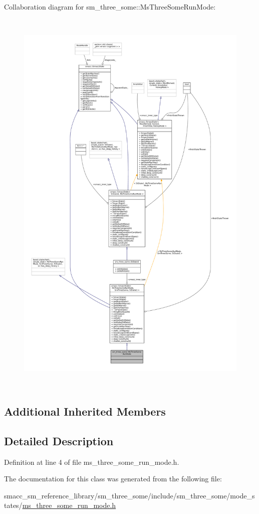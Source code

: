 Collaboration diagram for sm\+\_\+three\+\_\+some\+:\+:Ms\+Three\+Some\+Run\+Mode\+:
\nopagebreak
\begin{figure}[H]
\begin{center}
\leavevmode
\includegraphics[height=550pt]{classsm__three__some_1_1MsThreeSomeRunMode__coll__graph}
\end{center}
\end{figure}
\subsection*{Additional Inherited Members}


\subsection{Detailed Description}


Definition at line 4 of file ms\+\_\+three\+\_\+some\+\_\+run\+\_\+mode.\+h.



The documentation for this class was generated from the following file\+:\begin{DoxyCompactItemize}
\item 
smacc\+\_\+sm\+\_\+reference\+\_\+library/sm\+\_\+three\+\_\+some/include/sm\+\_\+three\+\_\+some/mode\+\_\+states/\hyperlink{ms__three__some__run__mode_8h}{ms\+\_\+three\+\_\+some\+\_\+run\+\_\+mode.\+h}\end{DoxyCompactItemize}
